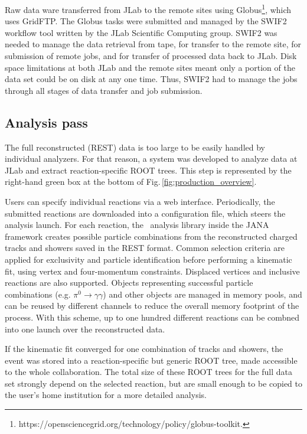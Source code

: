 Raw data ware transferred from JLab to the remote sites using Globus\footnote{https://opensciencegrid.org/technology/policy/globus-toolkit.},  which uses GridFTP. The Globus tasks were submitted and managed by the SWIF2 workflow tool written by the JLab Scientific Computing group. SWIF2 was needed to manage the data retrieval from tape, for transfer to the remote site, for submission of remote jobs, and for transfer of processed data back to JLab. Disk space limitations at both JLab and the remote sites meant only a portion of the data set could be on disk at any one time. Thus, SWIF2 had to manage the jobs through all stages of data transfer and job submission.

\subsection{Analysis pass \label{sec:recanalysis}}

The full reconstructed (REST) data is too large to be easily handled by individual analyzers. For that reason, a system was developed to analyze data at JLab and extract reaction-specific ROOT trees. This step is represented by the right-hand green box at the bottom of Fig.\,\ref{fig:production_overview}.

Users can specify individual reactions via a web interface.
Periodically, the submitted reactions are downloaded into a configuration file, which steers the analysis launch. For each reaction, the \GX~analysis library inside the JANA framework creates possible particle combinations from the reconstructed charged tracks and showers saved in the REST format. Common selection criteria are applied for exclusivity and particle identification before performing a kinematic fit, using vertex and four-momentum constraints. Displaced vertices and inclusive reactions are also supported. Objects representing successful particle combinations (e.g. $\pi^0 \rightarrow \gamma\gamma$) and other objects are managed in memory pools, and can be reused by different channels to reduce the overall memory footprint of the process. With this scheme, up to one hundred different reactions can be combned into one launch over the reconstructed data.

If the kinematic fit converged for one combination of tracks and showers, the event was stored into a reaction-specific but generic ROOT tree, made accessible to the whole collaboration. The total size of these ROOT trees for the full data set strongly depend on the selected reaction, but are small enough to be copied to the user's home institution for a more detailed analysis.

